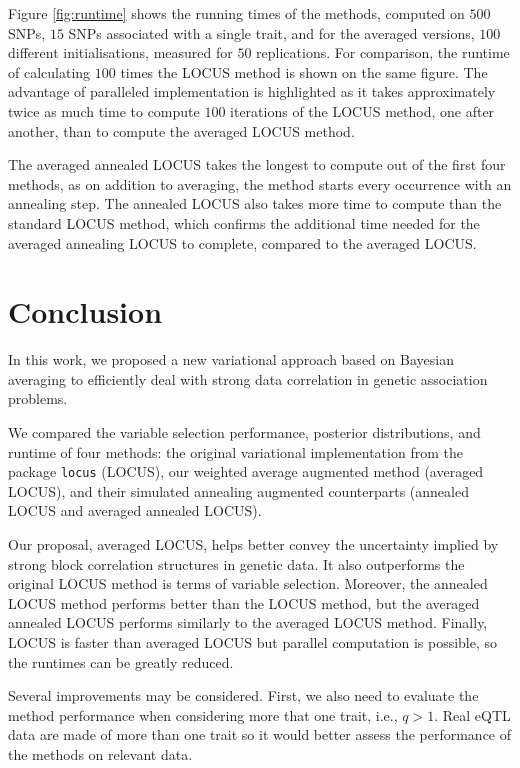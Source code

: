 \documentclass[a4paper, 11pt]{report}
\numberwithin{equation}{chapter}
\begin{document}
Figure \ref{fig:runtime} shows the running times of the methods, computed on $500$ SNPs, $15$ SNPs associated with a single trait, and for the averaged versions, $100$ different initialisations, measured for $50$ replications. For comparison, the runtime of calculating $100$ times the LOCUS method is shown on the same figure. The advantage of paralleled implementation is highlighted as it takes approximately twice as much time to compute $100$ iterations of the LOCUS method, one after another, than to compute the averaged LOCUS method.

The averaged annealed LOCUS takes the longest to compute out of the first four methods, as on addition to averaging, the method starts every occurrence with an annealing step. The annealed LOCUS also takes more time to compute than the standard LOCUS method, which confirms the additional time needed for the averaged annealing LOCUS to complete, compared to the averaged LOCUS.
%
%
%
%
%
%
\newpage
\chapter{Conclusion}
In this work, we proposed a new variational approach based on Bayesian averaging to efficiently deal with strong data correlation in genetic association problems.

We compared the variable selection performance, posterior distributions, and runtime of four methods: the original variational implementation from the package \texttt{locus} (LOCUS), our weighted average augmented method (averaged LOCUS), and their simulated annealing augmented counterparts (annealed LOCUS and averaged annealed LOCUS). 

Our proposal, averaged LOCUS, helps better convey the uncertainty implied by strong block correlation structures in genetic data. It also outperforms the original LOCUS method is terms of variable selection. Moreover, the annealed LOCUS method performs better than the LOCUS method, but the averaged annealed LOCUS performs similarly to the averaged LOCUS method. Finally, LOCUS is faster than averaged LOCUS but parallel computation is possible, so the runtimes can be greatly reduced.

Several improvements may be considered. First, we also need to evaluate the method performance when considering more that one trait, i.e., $q > 1$. Real eQTL data are made of more than one trait so it would better assess the performance of the methods on relevant data.
\end{document}
